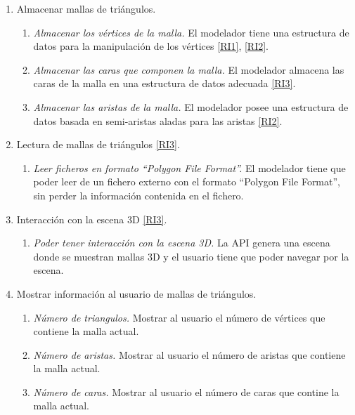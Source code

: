\begin{enumerate}[label=\textbf{\textit{RF-\arabic*}},ref=RF-\arabic*]
	\item \label{RF1}Almacenar mallas de triángulos.
	
	\begin{enumerate}[label*=\textbf{\textit{.\arabic*}}]
		\item \textit{Almacenar los vértices de la malla.} El modelador tiene una estructura de datos para la manipulación de los vértices \ref{RI1}, \ref{RI2}. 
		\item \textit{Almacenar las caras que componen la malla.} El modelador almacena las caras de la malla en una estructura de datos adecuada \ref{RI3}.
		\item \textit{Almacenar las aristas de la malla.} El modelador posee una estructura de datos basada en semi-aristas aladas para las aristas \ref{RI2}. 
	\end{enumerate}
	
	\item Lectura de mallas de triángulos \ref{RI3}.
		\begin{enumerate}[label*=\textbf{\textit{.\arabic*}}]
		\item \textit{Leer ficheros en formato ``Polygon File Format''.} El modelador tiene que poder leer de un fichero externo con el formato ``Polygon File Format'', sin perder la información contenida en el fichero.
		\end{enumerate}
	
	\item Interacción con la escena 3D \ref{RI3}.
	\begin{enumerate}[label*=\textbf{\textit{.\arabic*}}]
		\item \textit{Poder tener interacción con la escena 3D.} La API genera una escena donde se muestran mallas 3D y el usuario tiene que poder navegar por la escena.
	\end{enumerate}

	
	\item Mostrar información al usuario de mallas de triángulos.
	\begin{enumerate}[label*=\textbf{\textit{.\arabic*}}]
		\item \textit{Número de triangulos.} Mostrar al usuario el número de vértices que contiene la malla actual.  
		\item \textit{Número de aristas.} Mostrar al usuario el número de aristas que contiene la malla actual.
		\item \textit{Número de caras.} Mostrar al usuario el número de caras que contine la malla actual.
		

\end{enumerate}
\end{enumerate}

